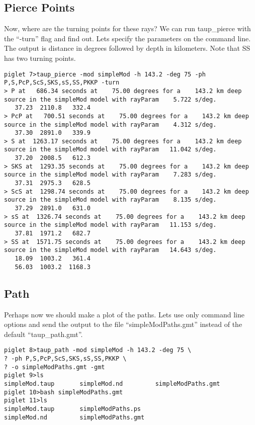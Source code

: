 \subsection{Pierce Points}

Now, where are the turning points for these rays? We can run taup\_pierce with
the ``-turn'' flag and
find out. Lets specify the parameters on the command line.
The output is distance in degrees followed by depth in kilometers. 
Note that SS has two turning points. 

\begin{verbatim}
piglet 7>taup_pierce -mod simpleMod -h 143.2 -deg 75 -ph P,S,PcP,ScS,SKS,sS,SS,PKKP -turn
> P at   686.34 seconds at    75.00 degrees for a    143.2 km deep source in the simpleMod model with rayParam    5.722 s/deg.
   37.23  2110.8   332.4
> PcP at   700.51 seconds at    75.00 degrees for a    143.2 km deep source in the simpleMod model with rayParam    4.312 s/deg.
   37.30  2891.0   339.9
> S at  1263.17 seconds at    75.00 degrees for a    143.2 km deep source in the simpleMod model with rayParam   11.042 s/deg.
   37.20  2008.5   612.3
> SKS at  1293.35 seconds at    75.00 degrees for a    143.2 km deep source in the simpleMod model with rayParam    7.283 s/deg.
   37.31  2975.3   628.5
> ScS at  1298.74 seconds at    75.00 degrees for a    143.2 km deep source in the simpleMod model with rayParam    8.135 s/deg.
   37.29  2891.0   631.0
> sS at  1326.74 seconds at    75.00 degrees for a    143.2 km deep source in the simpleMod model with rayParam   11.153 s/deg.
   37.81  1971.2   682.7
> SS at  1571.75 seconds at    75.00 degrees for a    143.2 km deep source in the simpleMod model with rayParam   14.643 s/deg.
   18.09  1003.2   361.4
   56.03  1003.2  1168.3
\end{verbatim}

\subsection{Path}

Perhaps now we should make a plot of the
paths. Lets use only command line options and send the output to the file 
``simpleModPaths.gmt'' instead of the default ``taup\_path.gmt''.

\begin{verbatim}
piglet 8>taup_path -mod simpleMod -h 143.2 -deg 75 \
? -ph P,S,PcP,ScS,SKS,sS,SS,PKKP \
? -o simpleModPaths.gmt -gmt
piglet 9>ls
simpleMod.taup       simpleMod.nd         simpleModPaths.gmt
piglet 10>bash simpleModPaths.gmt
piglet 11>ls
simpleMod.taup       simpleModPaths.ps
simpleMod.nd         simpleModPaths.gmt
\end{verbatim}

